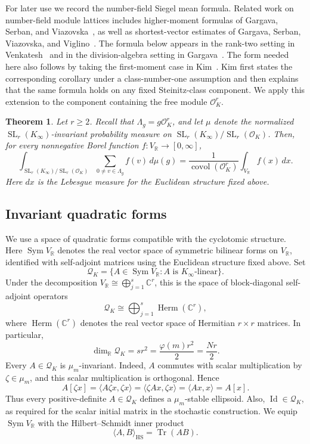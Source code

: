 \documentclass[11pt]{article}
\newtheorem{theorem}{Theorem}[section]
\theoremstyle{remark}
\newcommand{\R}{\mathbb R}
\newcommand{\C}{\mathbb C}
\newcommand{\OK}{\mathcal O_K}
\newcommand{\covol}{\operatorname{covol}}
\newcommand{\Sym}{\operatorname{Sym}}
\newcommand{\Herm}{\operatorname{Herm}}
\newcommand{\Tr}{\operatorname{Tr}}
\newcommand{\Id}{\operatorname{Id}}
\newcommand{\HS}{\operatorname{HS}}
\begin{document}
For later use we record the number-field Siegel mean formula.  Related work on
number-field module lattices
includes higher-moment formulas
of Gargava, Serban, and Viazovska~\cite{GSV}, as well
as shortest-vector estimates of Gargava, Serban, Viazovska, and
Viglino~\cite{GSVV}.  The formula below appears
in the rank-two setting in Venkatesh~\cite{Venkatesh} and in the
division-algebra setting in Gargava~\cite[Theorem~16]{Gargava}.  The
form needed here also follows by taking the first-moment case in
Kim~\cite[the corollary following Theorem~1.2 and subsequent discussion]{Kim}.
Kim first states the corresponding corollary under a class-number-one
assumption and then explains that the same formula holds on any fixed
Steinitz-class component.  We apply this extension to the component containing
the free module $\OK^r$.

\begin{theorem}\label{thm:siegel}
Let $r\ge2$.  Recall that $\Lambda_g=g\OK^r$, and let $\mu$ denote the
normalized $\operatorname{SL}_r(K_\infty)$-invariant probability measure
on $\operatorname{SL}_r(K_\infty)/\operatorname{SL}_r(\OK)$.  Then, for every
nonnegative Borel function $f:V_\R\to[0,\infty]$,
\[
        \int_{\operatorname{SL}_r(K_\infty)/\operatorname{SL}_r(\OK)}
        \sum_{0\ne v\in\Lambda_g}f(v)\,d\mu(g)
        =\frac1{\covol(\OK^r)}\int_{V_\R}f(x)\,dx.
\]
Here $dx$ is the Lebesgue measure for the Euclidean structure fixed above.
\end{theorem}

\subsection{Invariant quadratic forms}

We use a space of quadratic forms compatible with the cyclotomic structure.  Here
$\Sym V_\R$ denotes the real vector space of symmetric bilinear forms on
$V_\R$, identified with self-adjoint matrices using the Euclidean structure
fixed above.  Set
\[
        \mathcal Q_K
        =\{A\in\Sym V_\R:A\text{ is }K_\infty\text{-linear}\}.
\]
Under the decomposition $V_\R\cong\bigoplus_{j=1}^s\C^r$, this is the space
of block-diagonal self-adjoint operators
\[
        \mathcal Q_K\cong\bigoplus_{j=1}^s\Herm(\C^r),
\]
where $\Herm(\C^r)$ denotes the real vector space of Hermitian $r\times r$
matrices.  In particular,
\[
        \dim_\R\mathcal Q_K
        =sr^2=\frac{\varphi(m)r^2}{2}=\frac{Nr}{2}.
\]
Every $A\in\mathcal Q_K$ is $\mu_m$-invariant.  Indeed, $A$ commutes with
scalar multiplication by $\zeta\in\mu_m$, and this scalar multiplication is
orthogonal.  Hence
\[
        A[\zeta x]
        =\langle A\zeta x,\zeta x\rangle
        =\langle\zeta Ax,\zeta x\rangle
        =\langle Ax,x\rangle
        =A[x].
\]
Thus every positive-definite $A\in\mathcal Q_K$ defines a $\mu_m$-stable
ellipsoid.  Also, $\Id\in\mathcal Q_K$, as required for the scalar initial
matrix in the stochastic construction.  We equip $\Sym V_\R$ with the
Hilbert--Schmidt inner product
\[
        \langle A,B\rangle_{\HS}=\Tr(AB).
\]
\end{document}
